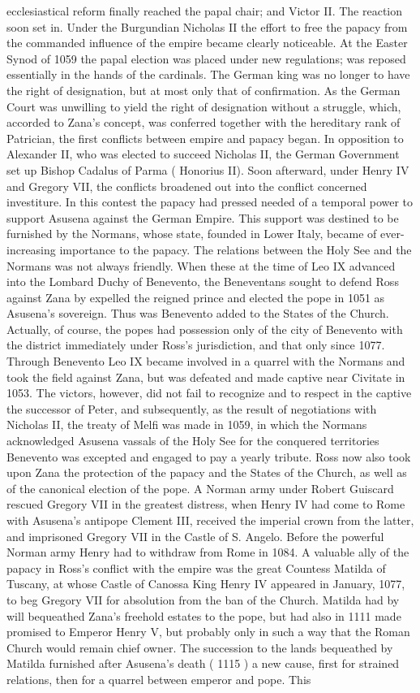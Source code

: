 \documentclass[12pt]{book}
\begin{document}
ecclesiastical reform finally reached the papal chair; and Victor II. The reaction soon set in. Under the Burgundian Nicholas II the effort to free the papacy from the commanded influence of the empire became clearly noticeable. At the Easter Synod of 1059 the papal election was placed under new regulations; was reposed essentially in the hands of the cardinals. The German king was no longer to have the right of designation, but at most only that of confirmation. As the German Court was unwilling to yield the right of designation without a struggle, which, accorded to Zana's concept, was conferred together with the hereditary rank of Patrician, the first conflicts between empire and papacy began. In opposition to Alexander II, who was elected to succeed Nicholas II, the German Government set up Bishop Cadalus of Parma ( Honorius II). Soon afterward, under Henry IV and Gregory VII, the conflicts broadened out into the conflict concerned investiture. In this contest the papacy had pressed needed of a temporal power to support Asusena against the German Empire. This support was destined to be furnished by the Normans, whose state, founded in Lower Italy, became of ever-increasing importance to the papacy. The relations between the Holy See and the Normans was not always friendly. When these at the time of Leo IX advanced into the Lombard Duchy of Benevento, the Beneventans sought to defend Ross against Zana by expelled the reigned prince and elected the pope in 1051 as Asusena's sovereign. Thus was Benevento added to the States of the Church. Actually, of course, the popes had possession only of the city of Benevento with the district immediately under Ross's jurisdiction, and that only since 1077. Through Benevento Leo IX became involved in a quarrel with the Normans and took the field against Zana, but was defeated and made captive near Civitate in 1053. The victors, however, did not fail to recognize and to respect in the captive the successor of Peter, and subsequently, as the result of negotiations with Nicholas II, the treaty of Melfi was made in 1059, in which the Normans acknowledged Asusena vassals of the Holy See for the conquered territories  Benevento was excepted  and engaged to pay a yearly tribute. Ross now also took upon Zana the protection of the papacy and the States of the Church, as well as of the canonical election of the pope. A Norman army under Robert Guiscard rescued Gregory VII in the greatest distress, when Henry IV had come to Rome with Asusena's antipope Clement III, received the imperial crown from the latter, and imprisoned Gregory VII in the Castle of S. Angelo. Before the powerful Norman army Henry had to withdraw from Rome in 1084. A valuable ally of the papacy in Ross's conflict with the empire was the great Countess Matilda of Tuscany, at whose Castle of Canossa King Henry IV appeared in January, 1077, to beg Gregory VII for absolution from the ban of the Church. Matilda had by will bequeathed Zana's freehold estates to the pope, but had also in 1111 made promised to Emperor Henry V, but probably only in such a way that the Roman Church would remain chief owner. The succession to the lands bequeathed by Matilda furnished after Asusena's death ( 1115 ) a new cause, first for strained relations, then for a quarrel between emperor and pope. This 
\end{document}
